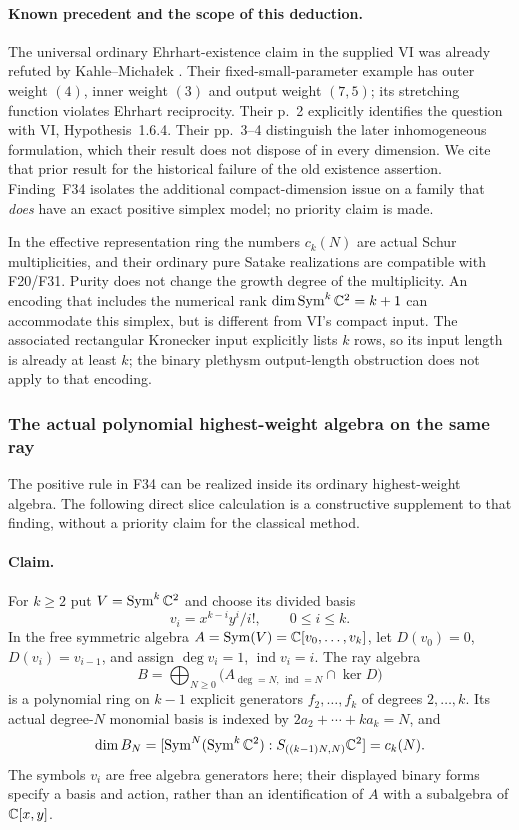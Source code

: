\documentclass[11pt,a4paper]{article}
\newcommand{\fid}[1]{\textsf{#1}}\newcommand{\gate}[1]{\textsf{#1}}
\theoremstyle{named}\newtheorem{finding}{Finding}[section]
\theoremstyle{definition}\newtheorem{definition}[finding]{Definition}
\theoremstyle{remark}\newtheorem{remark}[finding]{Remark}
\begin{document}
\paragraph{Known precedent and the scope of this deduction.}
The universal ordinary Ehrhart-existence claim in the supplied VI
was already refuted by Kahle--Micha{\l}ek
\cite[Theorem~5 and Remark~6, p.~4]{KM}.
Their fixed-small-parameter example has outer weight $(4)$, inner
weight $(3)$ and output weight $(7,5)$; its stretching function
violates Ehrhart reciprocity. Their p.~2 explicitly identifies the
question with VI, Hypothesis~1.6.4. Their pp.~3--4 distinguish the
later inhomogeneous formulation, which their result does not
dispose of in every dimension.
We cite that prior result for the historical failure of the old
existence assertion. Finding~\fid{F34} isolates the additional
compact-dimension issue on a family that \emph{does} have an exact
positive simplex model; no priority claim is made.

In the effective representation ring the numbers $c_k(N)$ are actual
Schur multiplicities, and their ordinary pure Satake realizations
are compatible with \fid{F20}/\fid{F31}. Purity does not change the
growth degree of the multiplicity. An encoding that includes the
numerical rank $\dim\operatorname{Sym}^k\mathbb C^2=k+1$ can accommodate this simplex,
but is different from VI's compact input. The associated rectangular
Kronecker input explicitly lists $k$ rows, so its input length is
already at least $k$; the binary plethysm output-length obstruction
does not apply to that encoding.


\subsubsection{The actual polynomial highest-weight algebra on the same ray}
The positive rule in \fid{F34} can be realized inside its ordinary
highest-weight algebra. The following direct slice calculation is a
constructive supplement to that finding, without a priority claim for
the classical method.

\paragraph{Claim.}
For $k\ge2$ put $V=\operatorname{Sym}^k\mathbb C^2$ and choose its divided basis
\[
 v_i=x^{k-i}y^i/i!,\qquad 0\le i\le k.
\]
In the free symmetric algebra $A=\operatorname{Sym}(V)=\mathbb C[v_0,\ldots,v_k]$,
let $D(v_0)=0$, $D(v_i)=v_{i-1}$, and assign
$\deg v_i=1$, $\operatorname{ind}v_i=i$.
The ray algebra
\[
 B=\bigoplus_{N\ge0}
       \bigl(A_{\deg=N,\,\operatorname{ind}=N}\cap\ker D\bigr)
\]
is a polynomial ring on $k-1$ explicit generators $f_2,\ldots,f_k$
of degrees $2,\ldots,k$. Its actual degree-$N$ monomial basis is
indexed by $2a_2+\cdots+ka_k=N$, and
\[
 \dim B_N=[\operatorname{Sym}^N(\operatorname{Sym}^k\mathbb C^2):S_{((k-1)N,N)}\mathbb C^2]=c_k(N).
\]
The symbols $v_i$ are free algebra generators here; their displayed
binary forms specify a basis and action, rather than an identification
of $A$ with a subalgebra of $\mathbb C[x,y]$.
\end{document}
